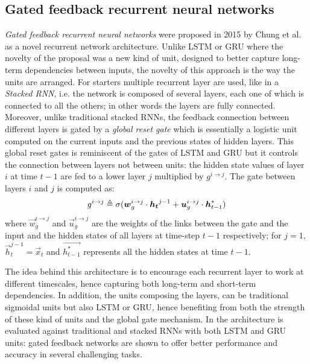 \subsection{Gated feedback recurrent neural networks}

\textit{Gated feedback recurrent neural networks} were proposed in 2015 by  Chung et al. \cite{gatedFeedback} as a novel recurrent network architecture.
Unlike LSTM or GRU where the novelty of the proposal was a new kind of unit, designed to better capture long-term dependencies between inputs, the novelty of this approach is the way the units are arranged. For starters multiple recurrent layer are used, like in a \textit{Stacked RNN}, i.e. the network is composed of several layers, each one of which is connected to all the others; in other words the layers are fully connected. Moreover, unlike traditional stacked RNNs, the feedback connection between different layers is gated by a \textit{global reset gate} which is essentially a logistic unit computed on the current inputs and the previous states of hidden layers. This global reset gates is reminiscent of the gates of LSTM and GRU but it controls the connection between layers not between units: the hidden state values of layer $i$ at time $t-1$ are fed to a lower layer $j$ multiplied by $g^{i\rightarrow j}$.
The gate between layers $i$ and $j$ is computed as:
\begin{equation}
g^{i\rightarrow j} \triangleq \sigma(\boldsymbol{w}_g^{i\rightarrow j} \cdot \boldsymbol{h_t}^{j-1} + \boldsymbol{u}_g^{i\rightarrow j} \cdot \boldsymbol{h}^*_{t-1})
\end{equation}
where $\vec{w}_g^{i\rightarrow j}$ and $\vec{u}_g^{i\rightarrow j}$ are the weights of the links between the gate and the input and the hidden states of all layers at time-step $t-1$ respectively; for $j=1$,  $\vec{h}_t^{j-1}=\vec{x}_t $  and $\vec{h^*_{t-1}}$ represents all the hidden states at time $t-1$.

The idea behind this architecture is to encourage each recurrent layer to work at different timescales, hence capturing both long-term and short-term dependencies. In addition, the units composing the layers, can be traditional sigmoidal units but also LSTM or GRU, hence benefiting from both the strength of these kind of units and the global gate mechanism. In \cite{gatedFeedback} the architecture is evaluated against traditional and stacked RNNs with both LSTM and GRU units: gated feedback networks are shown to offer better performance and accuracy in several challenging tasks.


